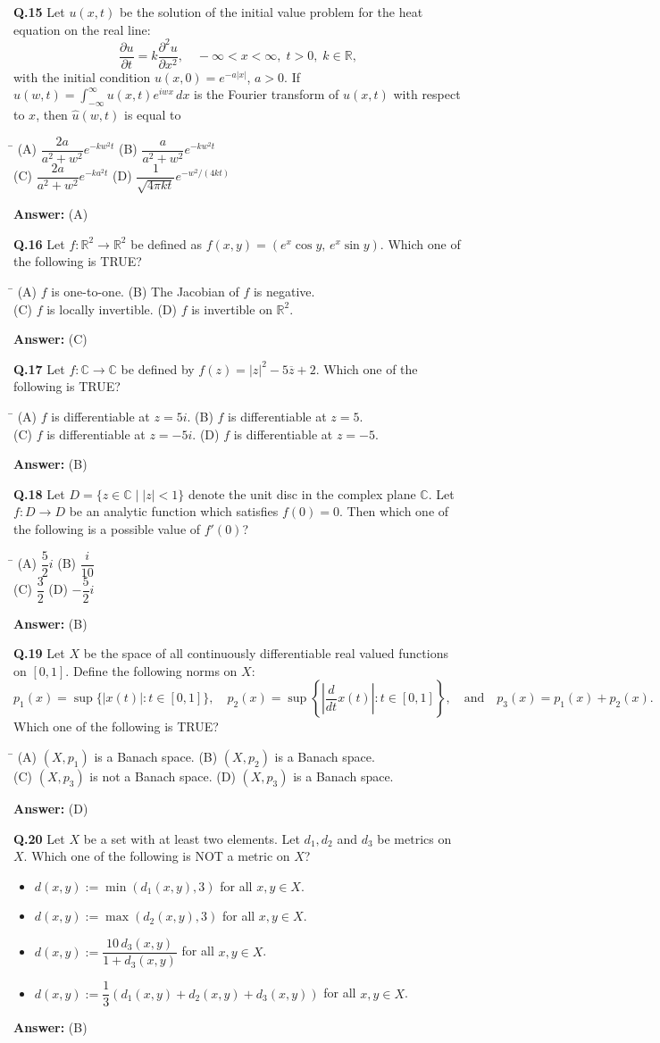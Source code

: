 \documentclass[11pt,a4paper]{article}
\newcommand{\optsfourA}[4]{%
  \begin{tabbing}
    \hspace{0.48\linewidth}\=\kill
    (A) #1 \> (B) #2 \\[2pt]
    (C) #3 \> (D) #4
  \end{tabbing}%
}
\newcommand{\optslistA}[4]{%
  \begin{itemize}
    \setlength{\itemsep}{2pt}\setlength{\parskip}{0pt}
    \item[(A)] #1
    \item[(B)] #2
    \item[(C)] #3
    \item[(D)] #4
  \end{itemize}%
}
\newcommand{\ans}[1]{\textbf{Answer:} #1\par\medskip}
\begin{document}
\textbf{Q.15} Let $u(x, t)$ be the solution of the initial value problem for the heat equation on the real line:
\[
  \frac{\partial u}{\partial t} = k \frac{\partial^2 u}{\partial x^2}, \quad -\infty < x < \infty, \; t > 0, \; k \in \mathbb{R},
\]
with the initial condition $u(x, 0) = e^{-a|x|}$, $a > 0$. If $\hat{u}(w, t) = \int_{-\infty}^{\infty} u(x, t) e^{iwx}\,dx$ is the Fourier transform of $u(x, t)$ with respect to $x$, then $\hat{u}(w, t)$ is equal to
\optsfourA{$\dfrac{2a}{a^2 + w^2} e^{-kw^2 t}$}{$\dfrac{a}{a^2 + w^2} e^{-kw^2 t}$}{$\dfrac{2a}{a^2 + w^2} e^{-ka^2 t}$}{$\dfrac{1}{\sqrt{4\pi kt}} e^{-w^2/(4kt)}$}
\ans{(A)}

\textbf{Q.16} Let $f : \mathbb{R}^2 \to \mathbb{R}^2$ be defined as $f(x, y) = (e^x \cos y, \, e^x \sin y)$. Which one of the following is TRUE?
\optsfourA{$f$ is one-to-one.}{The Jacobian of $f$ is negative.}{$f$ is locally invertible.}{$f$ is invertible on $\mathbb{R}^2$.}
\ans{(C)}

\textbf{Q.17} Let $f : \mathbb{C} \to \mathbb{C}$ be defined by $f(z) = |z|^2 - 5\overline{z} + 2$. Which one of the following is TRUE?
\optsfourA{$f$ is differentiable at $z = 5i$.}{$f$ is differentiable at $z = 5$.}{$f$ is differentiable at $z = -5i$.}{$f$ is differentiable at $z = -5$.}
\ans{(B)}

\textbf{Q.18} Let $D = \{z \in \mathbb{C} \mid |z| < 1\}$ denote the unit disc in the complex plane $\mathbb{C}$. Let $f : D \to D$ be an analytic function which satisfies $f(0) = 0$. Then which one of the following is a possible value of $f'(0)$?
\optsfourA{$\dfrac{5}{2}i$}{$\dfrac{i}{10}$}{$\dfrac{3}{2}$}{$-\dfrac{5}{2}i$}
\ans{(B)}

\textbf{Q.19} Let $X$ be the space of all continuously differentiable real valued functions on $[0, 1]$. Define the following norms on $X$:
\[
  p_1(x) = \sup\{|x(t)| : t \in [0, 1]\}, \quad p_2(x) = \sup\left\{\left|\frac{d}{dt} x(t)\right| : t \in [0, 1]\right\}, \quad \text{and} \quad p_3(x) = p_1(x) + p_2(x).
\]
Which one of the following is TRUE?
\optsfourA{$(X, p_1)$ is a Banach space.}{$(X, p_2)$ is a Banach space.}{$(X, p_3)$ is not a Banach space.}{$(X, p_3)$ is a Banach space.}
\ans{(D)}

\textbf{Q.20} Let $X$ be a set with at least two elements. Let $d_1, d_2$ and $d_3$ be metrics on $X$. Which one of the following is NOT a metric on $X$?
\optslistA{$d(x, y) := \min(d_1(x, y), 3)$ for all $x, y \in X$.}{$d(x, y) := \max(d_2(x, y), 3)$ for all $x, y \in X$.}{$d(x, y) := \dfrac{10\,d_3(x, y)}{1 + d_3(x, y)}$ for all $x, y \in X$.}{$d(x, y) := \dfrac{1}{3}(d_1(x, y) + d_2(x, y) + d_3(x, y))$ for all $x, y \in X$.}
\ans{(B)}
\end{document}
